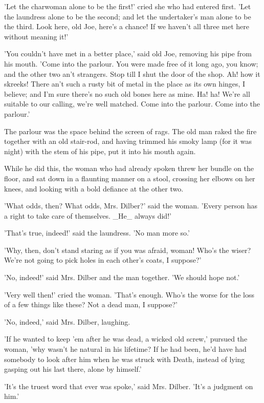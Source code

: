 'Let the charwoman alone to be the first!' cried she who had entered
first. 'Let the laundress alone to be the second; and let the
undertaker's man alone to be the third. Look here, old Joe, here's a
chance! If we haven't all three met here without meaning it!'

'You couldn't have met in a better place,' said old Joe, removing his
pipe from his mouth. 'Come into the parlour. You were made free of it
long ago, you know; and the other two an't strangers. Stop till I shut
the door of the shop. Ah! how it skreeks! There an't such a rusty bit of
metal in the place as its own hinges, I believe; and I'm sure there's no
such old bones here as mine. Ha! ha! We're all suitable to our calling,
we're well matched. Come into the parlour. Come into the parlour.'

The parlour was the space behind the screen of rags. The old man raked
the fire together with an old stair-rod, and having trimmed his smoky
lamp (for it was night) with the stem of his pipe, put it into his mouth
again.

While he did this, the woman who had already spoken threw her bundle on
the floor, and sat down in a flaunting manner on a stool, crossing her
elbows on her knees, and looking with a bold defiance at the other two.

'What odds, then? What odds, Mrs. Dilber?' said the woman. 'Every person
has a right to take care of themselves. _He_ always did!'

'That's true, indeed!' said the laundress. 'No man more so.'

'Why, then, don't stand staring as if you was afraid, woman! Who's the
wiser? We're not going to pick holes in each other's coats, I suppose?'

'No, indeed!' said Mrs. Dilber and the man together. 'We should hope
not.'

'Very well then!' cried the woman. 'That's enough. Who's the worse for
the loss of a few things like these? Not a dead man, I suppose?'

'No, indeed,' said Mrs. Dilber, laughing.

'If he wanted to keep 'em after he was dead, a wicked old screw,'
pursued the woman, 'why wasn't he natural in his lifetime? If he had
been, he'd have had somebody to look after him when he was struck with
Death, instead of lying gasping out his last there, alone by himself.'

'It's the truest word that ever was spoke,' said Mrs. Dilber. 'It's a
judgment on him.'


